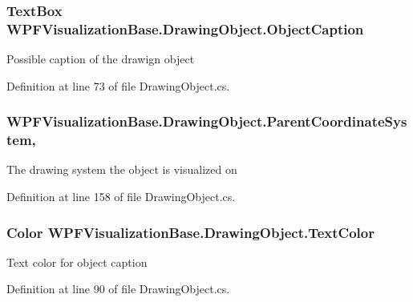 \subsubsection[{\texorpdfstring{Object\+Caption}{ObjectCaption}}]{\setlength{\rightskip}{0pt plus 5cm}Text\+Box W\+P\+F\+Visualization\+Base.\+Drawing\+Object.\+Object\+Caption\hspace{0.3cm}{\ttfamily [get]}}\hypertarget{class_w_p_f_visualization_base_1_1_drawing_object_a73d9c8f51576e41694183cd35577553b}{}\label{class_w_p_f_visualization_base_1_1_drawing_object_a73d9c8f51576e41694183cd35577553b}


Possible caption of the drawign object 



Definition at line 73 of file Drawing\+Object.\+cs.

\subsubsection[{\texorpdfstring{Parent\+Coordinate\+System}{ParentCoordinateSystem}}]{ W\+P\+F\+Visualization\+Base.\+Drawing\+Object.\+Parent\+Coordinate\+System\hspace{0.3cm}{\ttfamily [get]}, {\ttfamily [set]}}\hypertarget{class_w_p_f_visualization_base_1_1_drawing_object_add482010868cc049701792a44ec06a08}{}\label{class_w_p_f_visualization_base_1_1_drawing_object_add482010868cc049701792a44ec06a08}


The drawing system the object is visualized on 



Definition at line 158 of file Drawing\+Object.\+cs.

\subsubsection[{\texorpdfstring{Text\+Color}{TextColor}}]{\setlength{\rightskip}{0pt plus 5cm}Color W\+P\+F\+Visualization\+Base.\+Drawing\+Object.\+Text\+Color\hspace{0.3cm}{\ttfamily [get]}}\hypertarget{class_w_p_f_visualization_base_1_1_drawing_object_a6d3ff09f6f239b9ee41f21eb83dfca3c}{}\label{class_w_p_f_visualization_base_1_1_drawing_object_a6d3ff09f6f239b9ee41f21eb83dfca3c}


Text color for object caption 



Definition at line 90 of file Drawing\+Object.\+cs.

